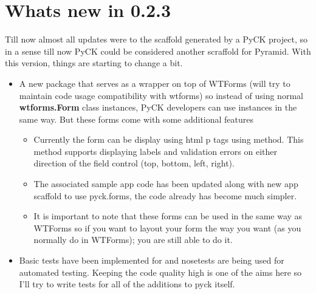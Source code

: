 \documentclass[letterpaper,10pt,english]{sphinxmanual}
\begin{document}
\section{Whats new in 0.2.3}
\label{changes:whats-new-in-0-2-3}
Till now almost all updates were to the scaffold generated by a PyCK project, so in a sense till now PyCK could be considered another scraffold for Pyramid. With this version, things are starting to change a bit.
\begin{itemize}
\item {} 
A new package {\hyperref[pyck-forms:module-pyck.forms]{}} that serves as a wrapper on top of WTForms (will try to maintain code usage compatibility with wtforms) so instead of using normal \textbf{wtforms.Form} class instances, PyCK developers can use {\hyperref[pyck-forms:pyck.forms.Form]{}} instances in the same way. But these forms come with some additional features
\begin{itemize}
\item {} 
Currently the form can be display using html p tags using {\hyperref[pyck-forms:pyck.forms.Form.as_p]{}} method. This method supports displaying labels and validation errors on either direction of the field control (top, bottom, left, right).

\item {} 
The associated sample app code has been updated along with new app scaffold to use pyck.forms, the code already has become much simpler.

\item {} 
It is important to note that these forms can be used in the same way as WTForms so if you want to layout your form the way you want (as you normally do in WTForms); you are still able to do it.

\end{itemize}

\item {} 
Basic tests have been implemented for {\hyperref[pyck-forms:module-pyck.forms]{}} and nosetests are being used for automated testing. Keeping the code quality high is one of the aims here so I'll try to write tests for all of the additions to pyck itself.

\end{itemize}
\end{document}
